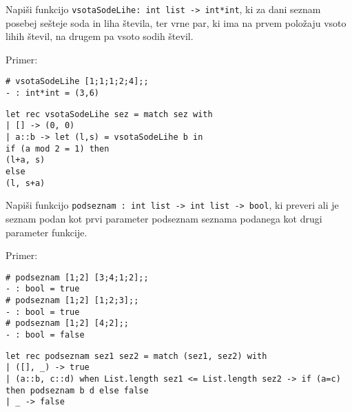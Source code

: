 \begin{ex}
Napi\v si funkcijo \lstinline{vsotaSodeLihe: int list -> int*int}, ki za dani seznam posebej se\v steje soda in liha \v stevila, ter vrne par, ki ima na prvem polo\v zaju vsoto lihih \v stevil, na drugem pa vsoto sodih \v stevil.

Primer: \begin{lstlisting}
# vsotaSodeLihe [1;1;1;2;4];;
- : int*int = (3,6)
\end{lstlisting}

\begin{sol}
\begin{lstlisting}
let rec vsotaSodeLihe sez = match sez with
| [] -> (0, 0)
| a::b -> let (l,s) = vsotaSodeLihe b in 
if (a mod 2 = 1) then 
(l+a, s) 
else 
(l, s+a)
\end{lstlisting}
\end{sol}



\end{ex}
\begin{ex}
Napi\v si funkcijo \lstinline{podseznam : int list -> int list -> bool}, ki preveri ali je seznam podan kot prvi parameter podseznam seznama podanega kot drugi parameter funkcije.

Primer: \begin{lstlisting}
# podseznam [1;2] [3;4;1;2];;
- : bool = true
# podseznam [1;2] [1;2;3];;
- : bool = true
# podseznam [1;2] [4;2];;
- : bool = false
\end{lstlisting}

\begin{sol}
\begin{lstlisting}
let rec podseznam sez1 sez2 = match (sez1, sez2) with
| ([], _) -> true
| (a::b, c::d) when List.length sez1 <= List.length sez2 -> if (a=c) then podseznam b d else false
| _ -> false
\end{lstlisting}
\end{sol}



\end{ex}
